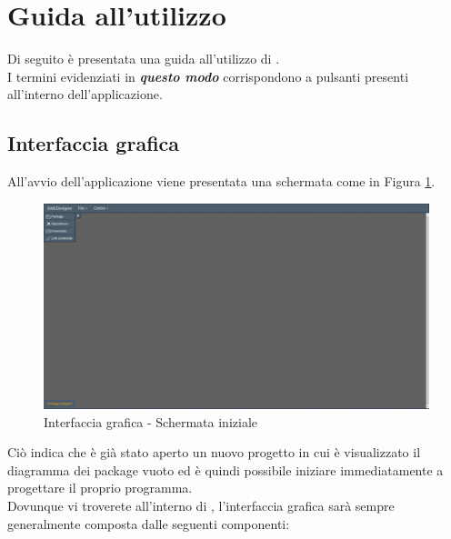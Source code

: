 \documentclass[../ManualeUtente.tex]{subfiles}
\begin{document}
	\section{Guida all'utilizzo}
		Di seguito è presentata una guida all'utilizzo di \progetto.\\
		I termini evidenziati in \textit{\textbf{questo modo}} corrispondono a pulsanti presenti all'interno
		dell'applicazione.
		\subsection{Interfaccia grafica}
			All'avvio dell'applicazione viene presentata una schermata come in Figura \ref{fig:StartScreen}.
			\begin{figure} [h!]
				\centering
				\includegraphics[scale=0.24]{./Immagini/StartScreen.png}
				\caption{Interfaccia grafica - Schermata iniziale}\label{fig:StartScreen}
			\end{figure}
			Ciò indica che è già stato aperto un nuovo progetto in cui è visualizzato il diagramma dei package vuoto ed è
			quindi possibile iniziare immediatamente a progettare il proprio programma.\\
			Dovunque vi troverete all'interno di \progetto, l'interfaccia grafica sarà
			sempre generalmente composta dalle seguenti componenti:
\end{document}
